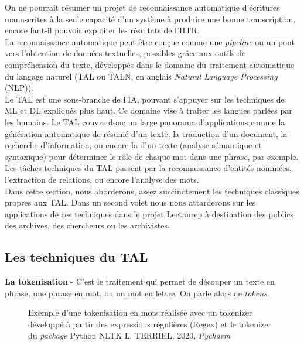 On ne pourrait résumer un projet de reconnaissance automatique d'écritures manuscrites à la seule capacité d'un système à produire une bonne transcription, encore faut-il pouvoir exploiter les résultats de l'HTR.\\

La reconnaissance automatique peut-être conçue comme une \textit{pipeline} ou un pont vers l'obtention de données textuelles, possibles grâce aux outils de compréhension du texte, développés dans le domaine du traitement automatique du langage naturel (TAL ou TALN, en anglais \textit{Natural Language Processing} (NLP)).\\

Le TAL est une sous-branche de l'IA, pouvant s'appuyer sur les techniques de ML et DL expliqués plus haut. Ce domaine vise à traiter les langues parlées par les humains. Le TAL couvre donc un large panorama d'applications comme la génération automatique de résumé d'un texte, la traduction d'un document, la recherche d'information, ou encore la  d'un texte (analyse sémantique et syntaxique) pour déterminer le rôle de chaque mot dans une phrase, par exemple. Les tâches techniques du TAL passent par la reconnaissance d'entités nommées, l'extraction de relations, ou encore l'analyse des mots.\\

Dans cette section, nous aborderons, assez succinctement les techniques classiques propres aux TAL. Dans un second volet nous nous attarderons sur les applications de ces techniques dans le projet Lectaurep à destination des publics des archives, des chercheurs ou les archivistes.\\
\newpage
\subsection{Les techniques du TAL}

\textbf{La tokenisation} - C'est le traitement qui permet de découper un texte en phrase, une phrase en mot, ou un mot en lettre. On parle alors de \textit{tokens}. 
\begin{figure}[h]
    \centering
    \centerline{}
    \caption{Exemple d'une tokenisation en mots réalisée avec un tokenizer développé à partir des expressions régulières (Regex) et le tokenizer du \textit{package} Python NLTK \textcopyright L. TERRIEL, 2020, \textit{Pycharm}}
    \label{fig:tokenisation}
\end{figure}

